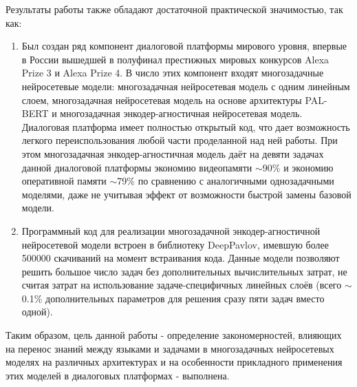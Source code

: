 Результаты работы также обладают достаточной практической значимостью, так как:
\begin{enumerate}
  \item Был создан ряд компонент диалоговой платформы мирового уровня, впервые в России вышедшей в полуфинал престижных мировых конкурсов Alexa Prize 3 и Alexa Prize 4. В число этих компонент входят многозадачные нейросетевые модели: многозадачная нейросетевая модель с одним линейным слоем, многозадачная нейросетевая модель на основе архитектуры PAL-BERT и многозадачная энкодер-агностичная нейросетевая модель. Диалоговая платформа имеет полностью открытый код, что дает возможность легкого переиспользования любой части проделанной над ней работы. При этом многозадачная энкодер-агностичная модель даёт на девяти задачах данной диалоговой платформы экономию видеопамяти $\sim$90\% и экономию оперативной памяти $\sim$79\% по сравнению с аналогичными однозадачными моделями, даже не учитывая эффект от возможности быстрой замены базовой модели.
  \item Программный код для реализации многозадачной энкодер-агностичной нейросетевой модели встроен в библиотеку DeepPavlov, имевшую более 500000 скачиваний на момент встраивания кода. Данные модели позволяют решить большое число задач без дополнительных вычислительных затрат, не считая затрат на использование задаче-специфичных линейных слоёв (всего $\sim$0.1\% дополнительных параметров для решения сразу пяти задач вместо одной).
\end{enumerate}

Таким образом, цель данной работы - определение закономерностей, влияющих на перенос знаний между языками и задачами в многозадачных нейросетевых моделях на различных архитектурах и на особенности прикладного применения этих моделей в диалоговых платформах - выполнена. 